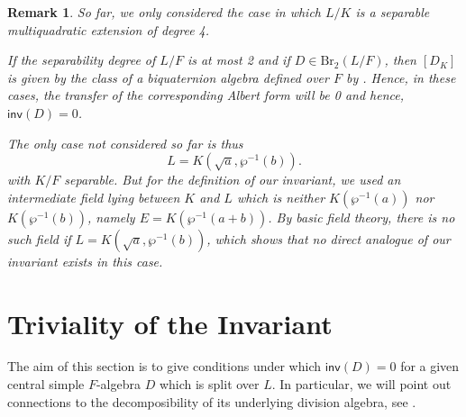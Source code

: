 \documentclass{amsart}
\newtheorem{remark}[definition]{Remark}
\numberwithin{equation}{section}
\newcommand{\BrTwo}{\mathrm{Br}_2}
\newcommand{\inv}{\mathsf{inv}}
\begin{document}
\begin{remark} \label{rem_OtherExtensions}
    So far, we only considered the case in which $L/K$ is a separable multiquadratic extension of degree 4.
    
    If the separability degree of $L / F$ is at most 2 and if $D \in \BrTwo(L/F)$, then $[D_K]$ is given by the class of a biquaternion algebra defined over $F$ by \cite[Corollary 1 (2)]{AravireLaghribiMultiQuadratic}.
    Hence, in these cases, the transfer of the corresponding Albert form will be 0 and hence, $\inv(D) = 0$.
    
    The only case not considered so far is thus  
    \[L = K(\sqrt a, \wp^{-1}(b)).\] 
    with $K / F$ separable. 
    But for the definition of our invariant, we used an intermediate field lying between $K$ and $L$ which is neither $K(\wp^{-1}(a))$ nor $K(\wp^{-1}(b))$, namely $E = K(\wp^{-1}(a + b))$.
    By basic field theory, there is no such field if $L = K(\sqrt a, \wp^{-1}(b))$, which shows that no direct analogue of our invariant exists in this case.
\end{remark}

\section{Triviality of the Invariant} \label{sec_InvTrivial}

The aim of this section is to give conditions under which $\inv(D) = 0$ for a given central simple $F$-algebra $D$ which is split over $L$.
In particular, we will point out connections to the decomposibility of its underlying division algebra, see .
\end{document}
